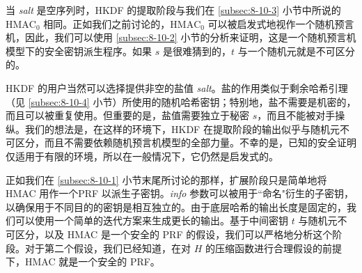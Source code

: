 当 \emph{salt} 是空序列时，HKDF 的提取阶段与我们在 \ref{subsec:8-10-3} 小节中所说的 $\mathrm{HMAC}_0$ 相同。正如我们之前讨论的，$\mathrm{HMAC}_0$ 可以被启发式地视作一个随机预言机，因此，我们可以使用 \ref{subsec:8-10-2} 小节的分析来证明，这是一个随机预言机模型下的安全密钥派生程序。如果 $s$ 是很难猜到的，$t$ 与一个随机元就是不可区分的。

HKDF 的用户当然可以选择提供非空的盐值 \emph{salt}。盐的作用类似于剩余哈希引理（见 \ref{subsec:8-10-4} 小节）所使用的随机哈希密钥；特别地，盐不需要是机密的，而且可以被重复使用。但重要的是，盐值需要独立于秘密 $s$，而且不能被对手操纵。我们的想法是，在这样的环境下，HKDF 在提取阶段的输出似乎与随机元不可区分，而且不需要依赖随机预言机模型的全部力量。不幸的是，已知的安全证明仅适用于有限的环境，所以在一般情况下，它仍然是启发式的。

正如我们在 \ref{subsec:8-10-1} 小节末尾所讨论的那样，扩展阶段只是简单地将 HMAC 用作一个PRF 以派生子密钥。\emph{info} 参数可以被用于``命名"衍生的子密钥，以确保用于不同目的的密钥是相互独立的。由于底层哈希的输出长度是固定的，我们可以使用一个简单的迭代方案来生成更长的输出。基于中间密钥 $t$ 与随机元不可区分，以及 HMAC 是一个安全的 PRF 的假设，我们可以严格地分析这个阶段。对于第二个假设，我们已经知道，在对 $H$ 的压缩函数进行合理假设的前提下，HMAC 就是一个安全的 PRF。